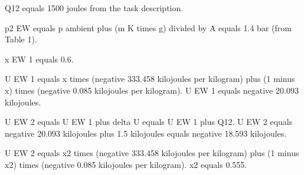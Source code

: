Q12 equals 1500 joules from the task description.  

p2 EW equals p ambient plus (m K times g) divided by A equals 1.4 bar (from Table 1).  

x EW 1 equals 0.6.  

U EW 1 equals x times (negative 333.458 kilojoules per kilogram) plus (1 minus x) times (negative 0.085 kilojoules per kilogram).  
U EW 1 equals negative 20.093 kilojoules.  

U EW 2 equals U EW 1 plus delta U equals U EW 1 plus Q12.  
U EW 2 equals negative 20.093 kilojoules plus 1.5 kilojoules equals negative 18.593 kilojoules.  

U EW 2 equals x2 times (negative 333.458 kilojoules per kilogram) plus (1 minus x2) times (negative 0.085 kilojoules per kilogram).  
x2 equals 0.555.